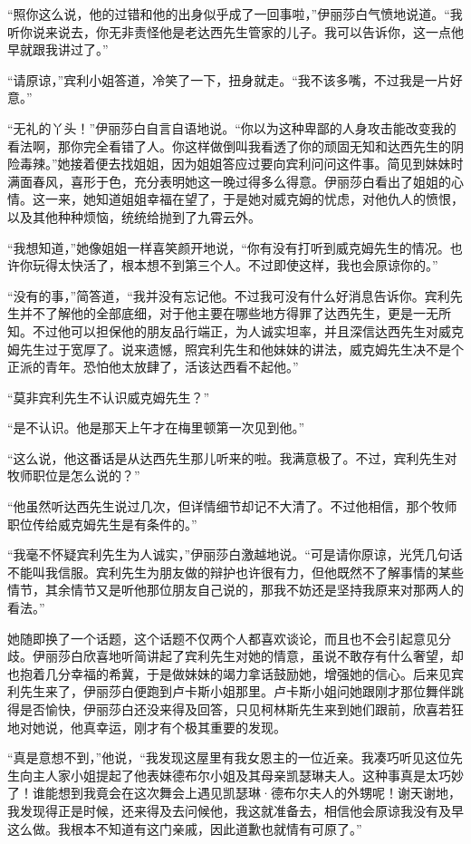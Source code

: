 \par “照你这么说，他的过错和他的出身似乎成了一回事啦，”伊丽莎白气愤地说道。“我听你说来说去，你无非责怪他是老达西先生管家的儿子。我可以告诉你，这一点他早就跟我讲过了。”
\par “请原谅，”宾利小姐答道，冷笑了一下，扭身就走。“我不该多嘴，不过我是一片好意。”
\par “无礼的丫头！”伊丽莎白自言自语地说。“你以为这种卑鄙的人身攻击能改变我的看法啊，那你完全看错了人。你这样做倒叫我看透了你的顽固无知和达西先生的阴险毒辣。”她接着便去找姐姐，因为姐姐答应过要向宾利问问这件事。简见到妹妹时满面春风，喜形于色，充分表明她这一晚过得多么得意。伊丽莎白看出了姐姐的心情。这一来，她知道姐姐幸福在望了，于是她对威克姆的忧虑，对他仇人的愤恨，以及其他种种烦恼，统统给抛到了九霄云外。
\par “我想知道，”她像姐姐一样喜笑颜开地说，“你有没有打听到威克姆先生的情况。也许你玩得太快活了，根本想不到第三个人。不过即使这样，我也会原谅你的。”
\par “没有的事，”简答道，“我并没有忘记他。不过我可没有什么好消息告诉你。宾利先生并不了解他的全部底细，对于他主要在哪些地方得罪了达西先生，更是一无所知。不过他可以担保他的朋友品行端正，为人诚实坦率，并且深信达西先生对威克姆先生过于宽厚了。说来遗憾，照宾利先生和他妹妹的讲法，威克姆先生决不是个正派的青年。恐怕他太放肆了，活该达西看不起他。”
\par “莫非宾利先生不认识威克姆先生？”
\par “是不认识。他是那天上午才在梅里顿第一次见到他。”
\par “这么说，他这番话是从达西先生那儿听来的啦。我满意极了。不过，宾利先生对牧师职位是怎么说的？”
\par “他虽然听达西先生说过几次，但详情细节却记不大清了。不过他相信，那个牧师职位传给威克姆先生是有条件的。”
\par “我毫不怀疑宾利先生为人诚实，”伊丽莎白激越地说。“可是请你原谅，光凭几句话不能叫我信服。宾利先生为朋友做的辩护也许很有力，但他既然不了解事情的某些情节，其余情节又是听他那位朋友自己说的，那我不妨还是坚持我原来对那两人的看法。”
\par 她随即换了一个话题，这个话题不仅两个人都喜欢谈论，而且也不会引起意见分歧。伊丽莎白欣喜地听简讲起了宾利先生对她的情意，虽说不敢存有什么奢望，却也抱着几分幸福的希冀，于是做妹妹的竭力拿话鼓励她，增强她的信心。后来见宾利先生来了，伊丽莎白便跑到卢卡斯小姐那里。卢卡斯小姐问她跟刚才那位舞伴跳得是否愉快，伊丽莎白还没来得及回答，只见柯林斯先生来到她们跟前，欣喜若狂地对她说，他真幸运，刚才有个极其重要的发现。
\par “真是意想不到，”他说，“我发现这屋里有我女恩主的一位近亲。我凑巧听见这位先生向主人家小姐提起了他表妹德布尔小姐及其母亲凯瑟琳夫人。这种事真是太巧妙了！谁能想到我竟会在这次舞会上遇见凯瑟琳·德布尔夫人的外甥呢！谢天谢地，我发现得正是时候，还来得及去问候他，我这就准备去，相信他会原谅我没有及早这么做。我根本不知道有这门亲戚，因此道歉也就情有可原了。”
